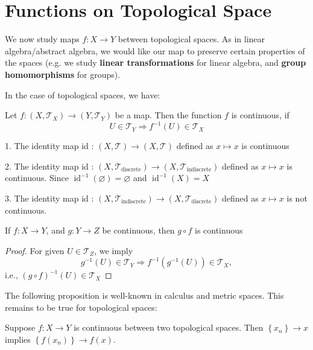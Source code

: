 \section{Functions on Topological Space}
We now study maps $f:X \to Y$ between topological spaces. As in linear algebra/abstract algebra, we would like our map to preserve certain properties of the spaces (e.g. we study {\bf linear transformations} for linear algebra, and {\bf group homomorphisms} for groups). 

In the case of topological spaces, we have:
\begin{definition} Let \(f : \left({X,{\mathcal{T}}_X}\right)  \rightarrow  \left({Y,{\mathcal{T}}_Y}\right)\) be a map. Then the function \(f\) is continuous, if
\[
U \in  {\mathcal{T}}_Y \Rightarrow  {f}^{-1}\left(U\right)  \in  {\mathcal{T}}_X
\]
\end{definition}

\begin{example}
1. The identity map id : \(\left({X,\mathcal{T}}\right)  \rightarrow  \left({X,\mathcal{T}}\right)\) defined as \(x \mapsto  x\) is continuous

2. The identity map id : \(\left({X,{\mathcal{T}}_{\text{discrete}}}\right)  \rightarrow  \left({X,{\mathcal{T}}_{\text{indiscrete}}}\right)\) defined as \(x \mapsto  x\) is continuous. Since \({\operatorname{id}}^{-1}\left(\varnothing \right)  = \varnothing\) and \({\operatorname{id}}^{-1}\left(X\right)  = X\)

3. The identity map id : \(\left({X,{\mathcal{T}}_{\text{indiscrete}}}\right)  \rightarrow  \left({X,{\mathcal{T}}_{\text{discrete}}}\right)\) defined as \(x \mapsto  x\) is not continuous.
\end{example}

\begin{proposition} \label{prop:comp_cont_is_cont} If \(f : X \rightarrow  Y\), and \(g : Y \rightarrow  Z\) be continuous, then \(g \circ  f\) is continuous
\end{proposition}

\begin{proof} For given \(U \in  {\mathcal{T}}_{Z}\), we imply
\[
{g}^{-1}\left(U\right)  \in  {\mathcal{T}}_Y \Rightarrow  {f}^{-1}\left({{g}^{-1}\left(U\right)}\right)  \in  {\mathcal{T}}_X,
\]
i.e., \({\left(g \circ  f\right)}^{-1}\left(U\right)  \in  {\mathcal{T}}_X\)
\end{proof}

The following proposition is well-known in calculus and metric spaces. This remains to be true for topological spaces:
\begin{proposition} Suppose \(f : X \rightarrow  Y\) is continuous between two topological spaces. Then \(\left\{  x_n\right\}   \rightarrow  x\) implies \(\left\{  {f\left(x_n\right)}\right\}   \rightarrow  f\left(x\right)\).
\end{proposition}

